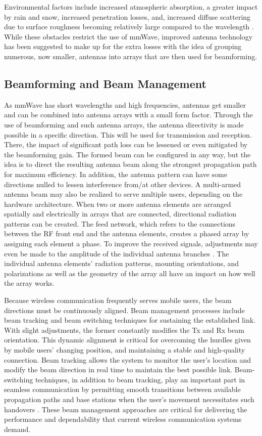 Environmental factors include increased atmospheric absorption, a greater impact by rain and snow, increased penetration losses, and, increased diffuse scattering due to surface roughness becoming relatively large compared to the wavelength \cite{6GWireless}. While these obstacles restrict the use of \ac{mmWave}, improved antenna technology has been suggested to make up for the extra losses with the idea of grouping numerous, now smaller, antennas into arrays that are then used for beamforming.
\subsection{Beamforming and Beam Management} \label{Beam Steering and Management}
As \ac{mmWave} has short wavelengths and high frequencies, antennas get smaller and can be combined into antenna arrays with a small form factor. Through the use of beamforming and such antenna arrays, the antenna directivity is made possible in a specific direction. This will be used for transmission and reception. There, the impact of significant path loss can be lessened or even mitigated by the beamforming gain. The formed beam can be configured in any way, but the idea is to direct the resulting antenna beam along the strongest propagation path for maximum efficiency. In addition, the antenna pattern can have some directions nulled to lessen interference from/at other devices. A multi-armed antenna beam may also be realized to serve multiple users, depending on the hardware architecture. When two or more antenna elements are arranged spatially and electrically in arrays that are connected, directional radiation patterns can be created. The feed network, which refers to the connections between the RF front end and the antenna elements, creates a phased array by assigning each element a phase. To improve the received signals, adjustments may even be made to the amplitude of the individual antenna branches \cite{Ali2017BeamformingTF}. The individual antenna elements' radiation patterns, mounting orientations, and polarizations as well as the geometry of the array all have an impact on how well the array works.

Because wireless communication frequently serves mobile users, the beam directions must be continuously aligned. Beam management processes include beam tracking and beam switching techniques for sustaining the established link. With slight adjustments, the former constantly modifies the Tx and Rx beam orientation. This dynamic alignment is critical for overcoming the hurdles given by mobile users' changing position, and maintaining a stable and high-quality connection. Beam tracking allows the system to monitor the user's location and modify the beam direction in real time to maintain the best possible link. Beam-switching techniques, in addition to beam tracking, play an important part in seamless communication by permitting smooth transitions between available propagation paths and base stations when the user's movement necessitates such handovers \cite{s23094359, 8947954}. These beam management approaches are critical for delivering the performance and dependability that current wireless communication systems demand.
